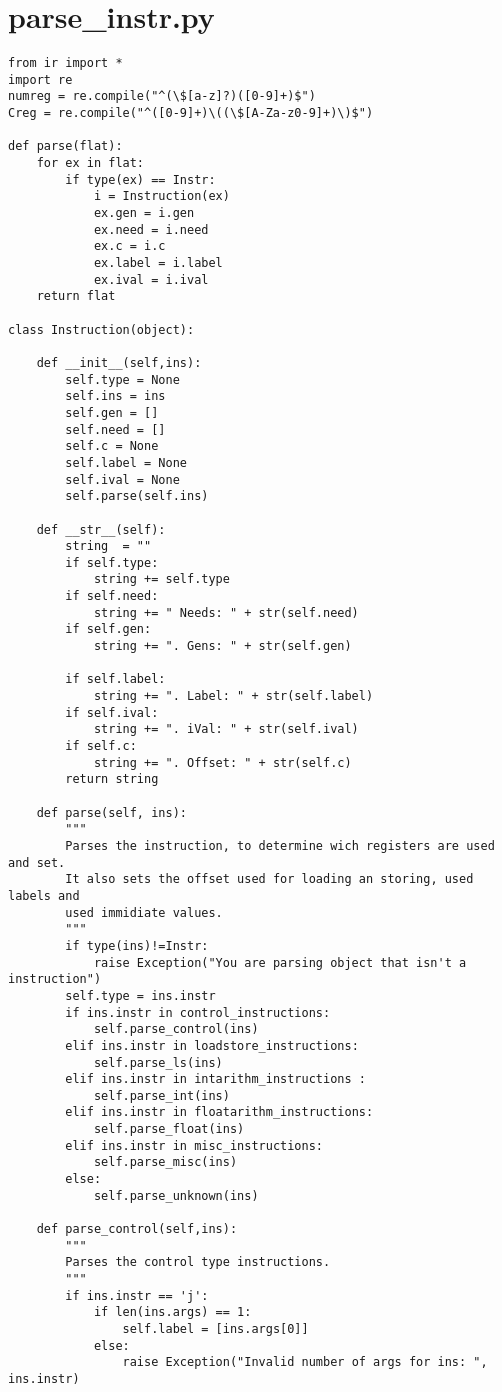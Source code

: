 \section{parse\_instr.py}
%
\begin{lstlisting}
from ir import *
import re
numreg = re.compile("^(\$[a-z]?)([0-9]+)$")
Creg = re.compile("^([0-9]+)\((\$[A-Za-z0-9]+)\)$")

def parse(flat):
    for ex in flat:
        if type(ex) == Instr:
            i = Instruction(ex)
            ex.gen = i.gen
            ex.need = i.need
            ex.c = i.c
            ex.label = i.label
            ex.ival = i.ival
    return flat

class Instruction(object):

    def __init__(self,ins):
        self.type = None
        self.ins = ins
        self.gen = []
        self.need = []
        self.c = None
        self.label = None
        self.ival = None
        self.parse(self.ins)

    def __str__(self):
        string  = ""
        if self.type:
            string += self.type
        if self.need:
            string += " Needs: " + str(self.need)
        if self.gen:
            string += ". Gens: " + str(self.gen)
            
        if self.label:
            string += ". Label: " + str(self.label)
        if self.ival:
            string += ". iVal: " + str(self.ival)
        if self.c:
            string += ". Offset: " + str(self.c)        
        return string
    
    def parse(self, ins):
        """
        Parses the instruction, to determine wich registers are used and set. 
        It also sets the offset used for loading an storing, used labels and
        used immidiate values.
        """
        if type(ins)!=Instr:
            raise Exception("You are parsing object that isn't a instruction")
        self.type = ins.instr
        if ins.instr in control_instructions:
            self.parse_control(ins)
        elif ins.instr in loadstore_instructions:
            self.parse_ls(ins)            
        elif ins.instr in intarithm_instructions :
            self.parse_int(ins)
        elif ins.instr in floatarithm_instructions:
            self.parse_float(ins)
        elif ins.instr in misc_instructions:
            self.parse_misc(ins)
        else:
            self.parse_unknown(ins)

    def parse_control(self,ins):
        """
        Parses the control type instructions.
        """    
        if ins.instr == 'j':
            if len(ins.args) == 1:
                self.label = [ins.args[0]]
            else:
                raise Exception("Invalid number of args for ins: ", ins.instr)
        

\end{lstlisting}
